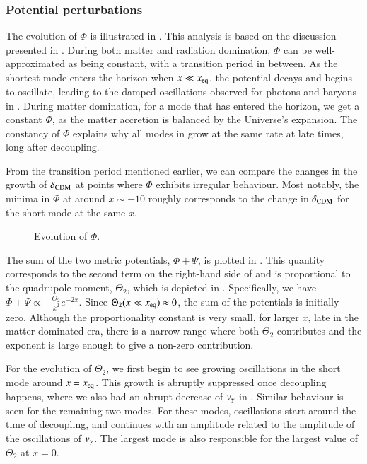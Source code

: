 \subsubsection{Potential perturbations} \label{sssec:M3:results:metric_perturbations}
The evolution of $\Phi$ is illustrated in . This analysis is based on the discussion presented in \cite[Ch. 8]{Dodelson}. During both matter and radiation domination, $\Phi$ can be well-approximated as being constant, with a transition period in between. As the shortest mode enters the horizon when $x\ll x_\mathrm{eq}$, the potential decays and begins to oscillate, leading to the damped oscillations observed for photons and baryons in . During matter domination, for a mode that has entered the horizon, we get a constant $\Phi$, as the matter accretion is balanced by the Universe's expansion. The constancy of $\Phi$ explains why all modes in  grow at the same rate at late times, long after decoupling. 

From the transition period mentioned earlier, we can compare the changes in the growth of $\delta_\mathrm{CDM}$ at points where $\Phi$ exhibits irregular behaviour. Most notably, the minima in $\Phi$ at around $x\sim-10$ roughly corresponds to the change in $\delta_\mathrm{CDM}$ for the short mode at the same $x$.

\begin{figure}[ht!]
    \caption{Evolution of $\Phi$.}
    \label{fig:M3:results:Phi}
\end{figure}

The sum of the two metric potentials, $\Phi+\Psi$, is plotted in . This quantity corresponds to the second term on the right-hand side of  and is proportional to the quadrupole moment, $\Theta_2$, which is depicted in . Specifically, we have $\Phi+\Psi \propto -\frac{\Theta_2}{k^2} e^{-2x}$. Since $\Theta_2(x\ll x_\mathrm{eq})\approx 0$, the sum of the potentials is initially zero. Although the proportionality constant is very small, for larger $x$, late in the matter dominated era, there is a narrow range where both $\Theta_2$ contributes and the exponent is large enough to give a non-zero contribution.

For the evolution of $\Theta_2$, we first begin to see growing oscillations in the short mode around $x=x_\mathrm{eq}$. This growth is abruptly suppressed once decoupling happens, where we also had an abrupt decrease of $v_\gamma$ in . Similar behaviour is seen for the remaining two modes. For these modes, oscillations start around the time of decoupling, and continues with an amplitude related to the amplitude of the oscillations of $v_\gamma$. The largest mode is also responsible for the largest value of $\Theta_2$ at $x=0$. 

